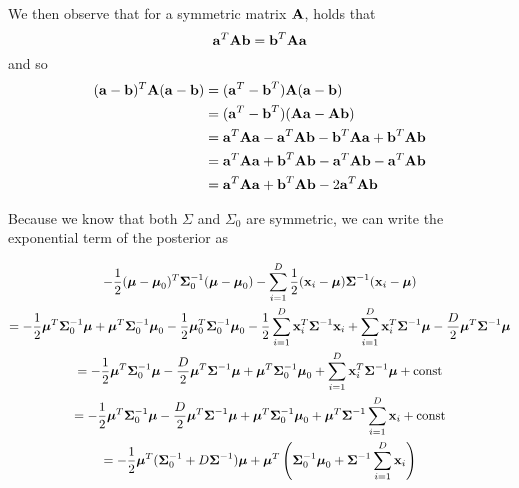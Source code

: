 \documentclass{amsmlaj}
\begin{document}
\begin{problem}
\begin{enumerate}
	We then observe that for a symmetric matrix $\vt{A}$, holds that
	\begin{equation}
		\vt{a}^T\vt{A}\vt{b}=\vt{b}^T\vt{A}\vt{a}
	\end{equation}
	and so
	\begin{equation} \label{eq:completing-squares}
		\begin{split}
			(\vt{a}-\vt{b})^T\vt{A}(\vt{a}-\vt{b})&=(\vt{a}^T-\vt{b}^T)\vt{A}(\vt{a}-\vt{b}) \\
			&=(\vt{a}^T-\vt{b}^T)(\vt{A}\vt{a}-\vt{A}\vt{b}) \\
			&=\vt{a}^T\vt{A}\vt{a}-\vt{a}^T\vt{A}\vt{b}-\vt{b}^T\vt{A}\vt{a}+\vt{b}^T\vt{A}\vt{b} \\
			&=\vt{a}^T\vt{A}\vt{a}+\vt{b}^T\vt{A}\vt{b}-\vt{a}^T\vt{A}\vt{b}-\vt{a}^T\vt{A}\vt{b} \\
			&=\vt{a}^T\vt{A}\vt{a}+\vt{b}^T\vt{A}\vt{b}-2\vt{a}^T\vt{A}\vt{b}
		\end{split}
	\end{equation}

	Because we know that both $\Sigma$ and $\Sigma_0$ are symmetric, we can write
	the exponential term of the posterior as

	\begin{multline} \label{}
			-\frac{1}{2}(\vt{\mu}-\vt{\mu}_0)^T\vt{\Sigma}_0^{-1}(\vt{\mu}-\vt{\mu}_0)
			-\sum_{i=1}^D\frac{1}{2}(\vt{x}_i-\vt{\mu})\vt{\Sigma}^{-1}(\vt{x}_i-\vt{\mu}) \\
			=-\frac{1}{2}\vt{\mu}^T\vt{\Sigma}_0^{-1}\vt{\mu}
			+\vt{\mu}^T\vt{\Sigma}_0^{-1}\vt{\mu}_0
			-\frac{1}{2}\vt{\mu}_0^T\vt{\Sigma}_0^{-1}\vt{\mu}_0
			-\frac{1}{2}\sum_{i=1}^D\vt{x}_i^T\vt{\Sigma}^{-1}\vt{x}_i
			+\sum_{i=1}^D\vt{x}_i^T\vt{\Sigma}^{-1}\vt{\mu}
			-\frac{D}{2}\vt{\mu}^T\vt{\Sigma}^{-1}\vt{\mu} \\
			=-\frac{1}{2}\vt{\mu}^T\vt{\Sigma}_0^{-1}\vt{\mu}
			-\frac{D}{2}\vt{\mu}^T\vt{\Sigma}^{-1}\vt{\mu}
			+\vt{\mu}^T\vt{\Sigma}_0^{-1}\vt{\mu}_0
			+\sum_{i=1}^D\vt{x}_i^T\vt{\Sigma}^{-1}\vt{\mu}
			+\text{const} \\
			=-\frac{1}{2}\vt{\mu}^T\vt{\Sigma}_0^{-1}\vt{\mu}
			-\frac{D}{2}\vt{\mu}^T\vt{\Sigma}^{-1}\vt{\mu}
			+\vt{\mu}^T\vt{\Sigma}_0^{-1}\vt{\mu}_0
			+\vt{\mu}^T\vt{\Sigma}^{-1}\sum_{i=1}^D\vt{x}_i
			+\text{const} \\
			=-\frac{1}{2}\vt{\mu}^T(\vt{\Sigma}_0^{-1}+D\vt{\Sigma}^{-1})\vt{\mu}
			+\vt{\mu}^T\left(
				\vt{\Sigma}_0^{-1}\vt{\mu}_0+\vt{\Sigma}^{-1}\sum_{i=1}^D\vt{x}_i
			\right)
	\end{multline}


\end{enumerate}
\end{problem}
\end{document}
